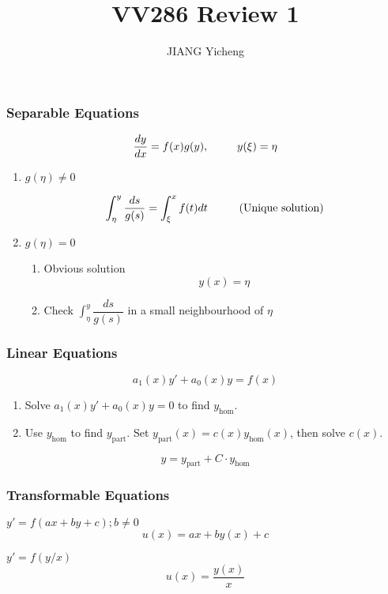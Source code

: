 \documentclass{beamer}
\title{\textcolor[rgb]{0,0.168,0.376}{VV286 Review 1}}
\author{JIANG Yicheng}
\begin{document}
\begin{frame}
\titlepage
\end{frame}


\begin{frame}
\frametitle{Separable Equations}
\begin{block}{}

$$\dfrac{dy}{dx}=f(x)g(y),\hspace{9mm}y(\xi)=\eta$$
\begin{enumerate}
\item $g(\eta)\neq0$


$$\int_{\eta}^y\dfrac{ds}{g(s)}=\int_{\xi}^xf(t)dt\hspace{10mm} \text{(Unique solution)}$$
\item $g(\eta)=0$
\begin{enumerate}
\item Obvious solution
$$y(x)=\eta$$
\item Check $\int_{\eta}^y\dfrac{ds}{g(s)}$ in a small neighbourhood of $\eta$
\end{enumerate}
\end{enumerate}
\end{block}
\end{frame}


\begin{frame}
\frametitle{Linear Equations}
\begin{block}{}
$$a_1(x)y'+a_0(x)y=f(x) $$
\begin{enumerate}
\item Solve  $a_1(x)y'+a_0(x)y=0$ to find $y_{\text{hom}}$.
\item Use $y_{\text{hom}}$ to find $y_{\text{part}}$.
 Set $y_{\text{part}}(x)=c(x)y_{\text{hom}}(x)$, then solve $c(x)$.
 
\end{enumerate}
$$y=y_{\text{part}}+C\cdot y_{\text{hom}}$$
\end{block}

\end{frame}

\begin{frame}
\frametitle{Transformable Equations}
\begin{block}{$y'=f(ax+by+c);b\neq0$}
$$u(x)=ax+by(x)+c$$
\end{block}
\begin{block}{$y'=f(y/x)$}
$$u(x)=\dfrac{y(x)}{x}$$
\end{block}
\end{frame}
\end{document}
